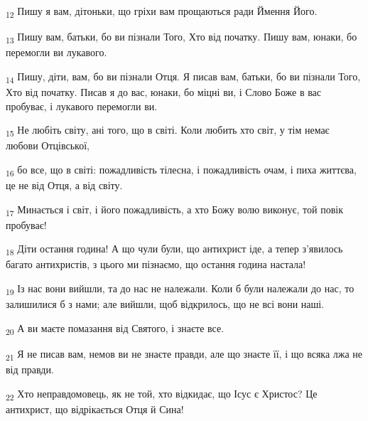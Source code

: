 \begin{tcolorbox}
\textsubscript{12} Пишу я вам, дітоньки, що гріхи вам прощаються ради Ймення Його.
\end{tcolorbox}
\begin{tcolorbox}
\textsubscript{13} Пишу вам, батьки, бо ви пізнали Того, Хто від початку. Пишу вам, юнаки, бо перемогли ви лукавого.
\end{tcolorbox}
\begin{tcolorbox}
\textsubscript{14} Пишу, діти, вам, бо ви пізнали Отця. Я писав вам, батьки, бо ви пізнали Того, Хто від початку. Писав я до вас, юнаки, бо міцні ви, і Слово Боже в вас пробуває, і лукавого перемогли ви.
\end{tcolorbox}
\begin{tcolorbox}
\textsubscript{15} Не любіть світу, ані того, що в світі. Коли любить хто світ, у тім немає любови Отцівської,
\end{tcolorbox}
\begin{tcolorbox}
\textsubscript{16} бо все, що в світі: пожадливість тілесна, і пожадливість очам, і пиха життєва, це не від Отця, а від світу.
\end{tcolorbox}
\begin{tcolorbox}
\textsubscript{17} Минається і світ, і його пожадливість, а хто Божу волю виконує, той повік пробуває!
\end{tcolorbox}
\begin{tcolorbox}
\textsubscript{18} Діти остання година! А що чули були, що антихрист іде, а тепер з'явилось багато антихристів, з цього ми пізнаємо, що остання година настала!
\end{tcolorbox}
\begin{tcolorbox}
\textsubscript{19} Із нас вони вийшли, та до нас не належали. Коли б були належали до нас, то залишилися б з нами; але вийшли, щоб відкрилось, що не всі вони наші.
\end{tcolorbox}
\begin{tcolorbox}
\textsubscript{20} А ви маєте помазання від Святого, і знаєте все.
\end{tcolorbox}
\begin{tcolorbox}
\textsubscript{21} Я не писав вам, немов ви не знаєте правди, але що знаєте її, і що всяка лжа не від правди.
\end{tcolorbox}
\begin{tcolorbox}
\textsubscript{22} Хто неправдомовець, як не той, хто відкидає, що Ісус є Христос? Це антихрист, що відрікається Отця й Сина!
\end{tcolorbox}
